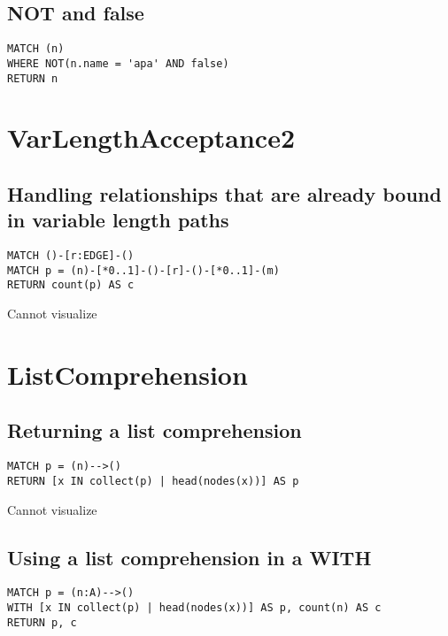 \subsection{NOT and false}

\begin{lstlisting}
MATCH (n)
WHERE NOT(n.name = 'apa' AND false)
RETURN n
\end{lstlisting}

\section{VarLengthAcceptance2}

\subsection{Handling relationships that are already bound in variable length paths}

\begin{lstlisting}
MATCH ()-[r:EDGE]-()
MATCH p = (n)-[*0..1]-()-[r]-()-[*0..1]-(m)
RETURN count(p) AS c
\end{lstlisting}

Cannot visualize
\section{ListComprehension}

\subsection{Returning a list comprehension}

\begin{lstlisting}
MATCH p = (n)-->()
RETURN [x IN collect(p) | head(nodes(x))] AS p
\end{lstlisting}

Cannot visualize
\subsection{Using a list comprehension in a WITH}

\begin{lstlisting}
MATCH p = (n:A)-->()
WITH [x IN collect(p) | head(nodes(x))] AS p, count(n) AS c
RETURN p, c
\end{lstlisting}

